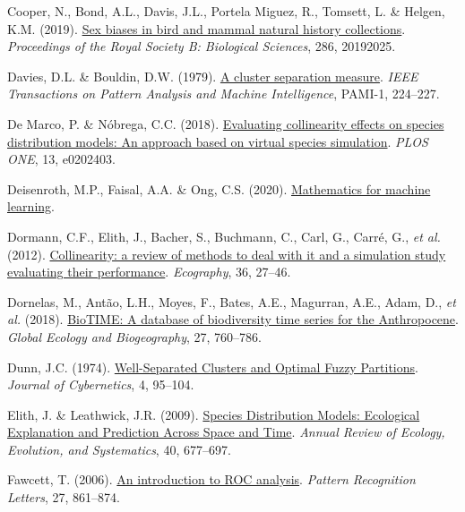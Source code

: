 \documentclass[
  letterpaper,
]{scrbook}
\newlength{\cslhangindent}
\newenvironment{CSLReferences}[2] %
 {\begin{list}{}{%
  \setlength{\itemindent}{0pt}
  \setlength{\leftmargin}{0pt}
  \setlength{\parsep}{0pt}
  \ifodd #1
   \setlength{\leftmargin}{\cslhangindent}
   \setlength{\itemindent}{-1\cslhangindent}
  \fi
  \setlength{\itemsep}{#2\baselineskip}}}
 {\end{list}}
\begin{document}
\begin{CSLReferences}{1}{0}
Cooper, N., Bond, A.L., Davis, J.L., Portela Miguez, R., Tomsett, L. \&
Helgen, K.M. (2019). \href{https://doi.org/10.1098/rspb.2019.2025}{Sex
biases in bird and mammal natural history collections}.
\emph{Proceedings of the Royal Society B: Biological Sciences}, 286,
20192025.

Davies, D.L. \& Bouldin, D.W. (1979).
\href{https://doi.org/10.1109/tpami.1979.4766909}{A cluster separation
measure}. \emph{IEEE Transactions on Pattern Analysis and Machine
Intelligence}, PAMI-1, 224--227.

De Marco, P. \& Nóbrega, C.C. (2018).
\href{https://doi.org/10.1371/journal.pone.0202403}{Evaluating
collinearity effects on species distribution models: An approach based
on virtual species simulation}. \emph{PLOS ONE}, 13, e0202403.

Deisenroth, M.P., Faisal, A.A. \& Ong, C.S. (2020).
\href{https://doi.org/10.1017/9781108679930}{Mathematics for machine
learning}.

Dormann, C.F., Elith, J., Bacher, S., Buchmann, C., Carl, G., Carré, G.,
\emph{et al.} (2012).
\href{https://doi.org/10.1111/j.1600-0587.2012.07348.x}{Collinearity: a
review of methods to deal with it and a simulation study evaluating
their performance}. \emph{Ecography}, 36, 27--46.

Dornelas, M., Antão, L.H., Moyes, F., Bates, A.E., Magurran, A.E., Adam,
D., \emph{et al.} (2018).
\href{https://doi.org/10.1111/geb.12729}{BioTIME: A database of
biodiversity time series for the Anthropocene}. \emph{Global Ecology and
Biogeography}, 27, 760--786.

Dunn, J.C. (1974).
\href{https://doi.org/10.1080/01969727408546059}{Well-Separated Clusters
and Optimal Fuzzy Partitions}. \emph{Journal of Cybernetics}, 4,
95--104.

Elith, J. \& Leathwick, J.R. (2009).
\href{https://doi.org/10.1146/annurev.ecolsys.110308.120159}{Species
Distribution Models: Ecological Explanation and Prediction Across Space
and Time}. \emph{Annual Review of Ecology, Evolution, and Systematics},
40, 677--697.

Fawcett, T. (2006).
\href{https://doi.org/10.1016/j.patrec.2005.10.010}{An introduction to
ROC analysis}. \emph{Pattern Recognition Letters}, 27, 861--874.


\end{CSLReferences}
\end{document}
